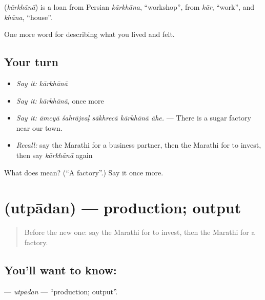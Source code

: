 \begin{cousinweb}
\textbf{} (\emph{kārkhānā}) is a loan from Persian \emph{kārkhāna}, \textquotedblleft{}workshop\textquotedblright{}, from \emph{kār}, \textquotedblleft{}work\textquotedblright{}, and \emph{khāna}, \textquotedblleft{}house\textquotedblright{}.
\end{cousinweb}

\begin{grammarlens}[title={What you've built}]
One more word for describing what you lived and felt.
\end{grammarlens}

\subsection*{Your turn}
\begin{itemize}
\raggedright
  \item \emph{Say it:} \emph{kārkhānā}
  \item \emph{Say it:} \emph{kārkhānā}, once more
  \item \emph{Say it:} \emph{āmcyā śahrājvaḷ sākhrecā kārkhānā āhe.} — There is a sugar factory near our town.
  \item \emph{Recall:} say the Marathi for a business partner, then the Marathi for to invest, then say \emph{kārkhānā} again
\end{itemize}

\begin{tcolorbox}[breakable,colback=teal!4,colframe=teal!35!black,title={Before you move on}]
What does  mean? (\textquotedblleft{}A factory\textquotedblright{}.) Say it once more.
\end{tcolorbox}
\section[\texorpdfstring{\mr{उत्पादन} (utpādan)}{उत्पादन (utpādan)}]{ (utpādan) — production; output}

\label{lesson:MR-C512-utpadan}



\begin{quote}
Before the new one: say the Marathi for to invest, then the Marathi for a factory.
\end{quote}

\subsection*{You'll want to know: }
\textbf{} — \emph{utpādan} — \textquotedblleft{}production; output\textquotedblright{}.

